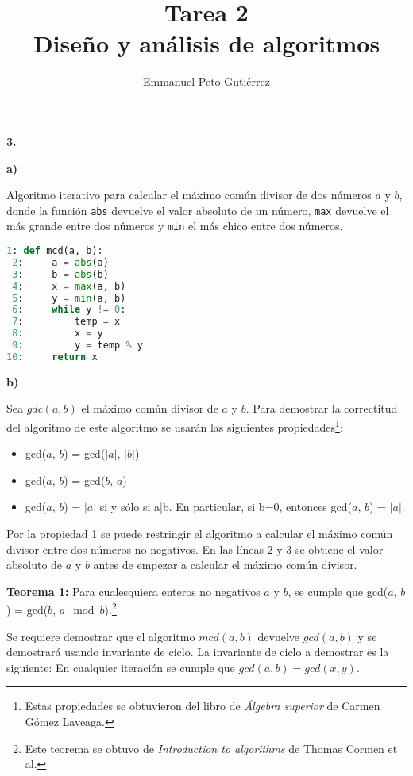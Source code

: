 \documentclass{article}
\title{Tarea 2\\Diseño y análisis de algoritmos}
\author{Emmanuel Peto Gutiérrez}
\begin{document}
\maketitle

\textbf{3.}

\textbf{a)}

Algoritmo iterativo para calcular el máximo común divisor de dos números $a$ y $b$, donde la función \texttt{abs} devuelve el valor absoluto de un número, \texttt{max} devuelve el más grande entre dos números y \texttt{min} el más chico entre dos números.

\begin{lstlisting}[language=Python]
 1: def mcd(a, b):
 2:     a = abs(a)
 3:     b = abs(b)
 4:     x = max(a, b)
 5:     y = min(a, b)
 6:     while y != 0:
 7:         temp = x
 8:         x = y
 9:         y = temp % y
10:     return x
\end{lstlisting}

\textbf{b)}

Sea $gdc(a, b)$ el máximo común divisor de $a$ y $b$. Para demostrar la correctitud del algoritmo de este algoritmo se usarán las siguientes propiedades\footnote{Estas propiedades se obtuvieron del libro de \textit{Álgebra superior} de Carmen Gómez Laveaga.}:

\begin{itemize}
\item[1.] gcd($a$, $b$) = gcd($|a|$, $|b|$)
\item[2.] gcd($a$, $b$) = gcd($b$, $a$)
\item[3.] gcd($a$, $b$) = $|a|$ si y sólo si a|b. En particular, si b=0, entonces gcd($a$, $b$) = $|a|$.
\end{itemize}

Por la propiedad 1 se puede restringir el algoritmo a calcular el máximo común divisor entre dos números no negativos. En las líneas 2 y 3 se obtiene el valor absoluto de $a$ y $b$ antes de empezar a calcular el máximo común divisor.

\textbf{Teorema 1:} Para cualesquiera enteros no negativos $a$ y $b$, se cumple que gcd($a$, $b$) = gcd($b$, $a \mod b$).\footnote{Este teorema se obtuvo de \textit{Introduction to algorithms} de Thomas Cormen et al.}

Se requiere demostrar que el algoritmo $mcd(a, b)$ devuelve $gcd(a, b)$ y se demostrará usando invariante de ciclo. La invariante de ciclo a demostrar es la siguiente: En cualquier iteración se cumple que $gcd(a, b) = gcd(x, y)$.
\end{document}

